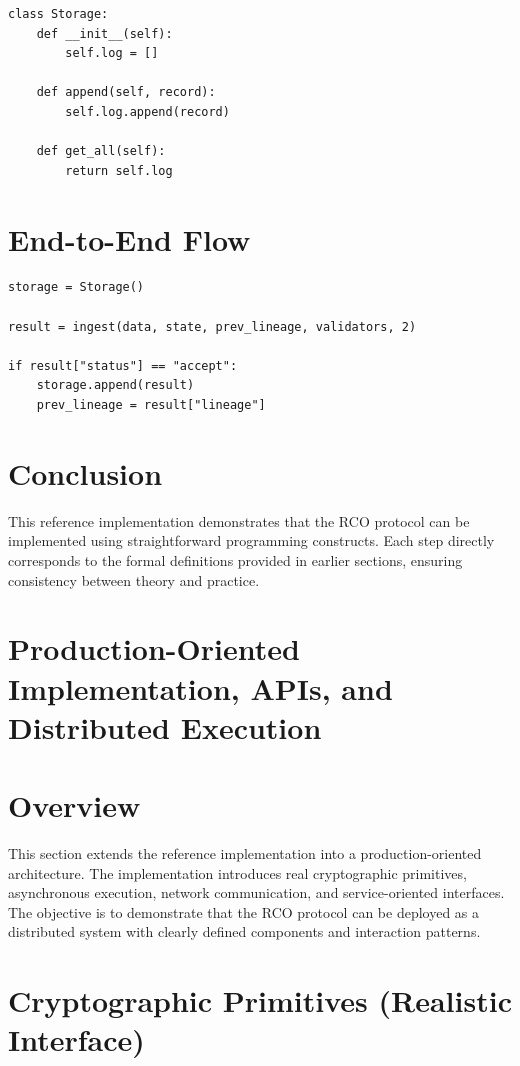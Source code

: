 \begin{verbatim}
class Storage:
    def __init__(self):
        self.log = []

    def append(self, record):
        self.log.append(record)

    def get_all(self):
        return self.log
\end{verbatim}

\section{End-to-End Flow}

\begin{verbatim}
storage = Storage()

result = ingest(data, state, prev_lineage, validators, 2)

if result["status"] == "accept":
    storage.append(result)
    prev_lineage = result["lineage"]
\end{verbatim}

\section{Conclusion}

This reference implementation demonstrates that the RCO protocol can be implemented using straightforward programming constructs. Each step directly corresponds to the formal definitions provided in earlier sections, ensuring consistency between theory and practice.

\section{Production-Oriented Implementation, APIs, and Distributed Execution}

\section{Overview}

This section extends the reference implementation into a production-oriented architecture. The implementation introduces real cryptographic primitives, asynchronous execution, network communication, and service-oriented interfaces. The objective is to demonstrate that the RCO protocol can be deployed as a distributed system with clearly defined components and interaction patterns.

\section{Cryptographic Primitives (Realistic Interface)}

